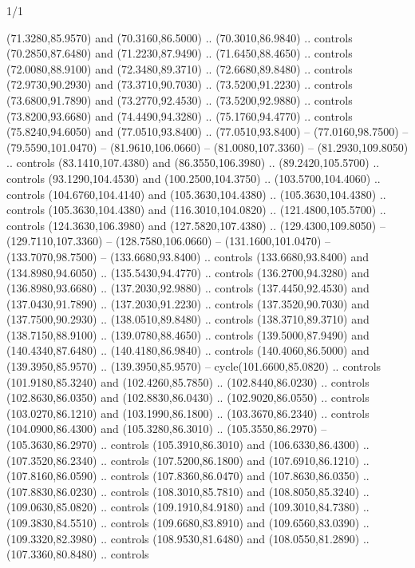 \begin{flagdescription}{1/1}
\begin{scope}[xshift=0.75\flaglength]
\begin{scope}[scale=0.00209\flagwidth,yshift=134.4mm,xshift=-29.7mm]
\begin{scope}[y=0.80pt, x=0.80pt, yscale=-1, xscale=1, inner sep=0pt, outer sep=0pt,line width=0.0015\flagwidth]
  (71.3280,85.9570) and (70.3160,86.5000) .. (70.3010,86.9840) .. controls
  (70.2850,87.6480) and (71.2230,87.9490) .. (71.6450,88.4650) .. controls
  (72.0080,88.9100) and (72.3480,89.3710) .. (72.6680,89.8480) .. controls
  (72.9730,90.2930) and (73.3710,90.7030) .. (73.5200,91.2230) .. controls
  (73.6800,91.7890) and (73.2770,92.4530) .. (73.5200,92.9880) .. controls
  (73.8200,93.6680) and (74.4490,94.3280) .. (75.1760,94.4770) .. controls
  (75.8240,94.6050) and (77.0510,93.8400) .. (77.0510,93.8400) --
  (77.0160,98.7500) -- (79.5590,101.0470) -- (81.9610,106.0660) --
  (81.0080,107.3360) -- (81.2930,109.8050) .. controls (83.1410,107.4380) and
  (86.3550,106.3980) .. (89.2420,105.5700) .. controls (93.1290,104.4530) and
  (100.2500,104.3750) .. (103.5700,104.4060) .. controls (104.6760,104.4140) and
  (105.3630,104.4380) .. (105.3630,104.4380) .. controls (105.3630,104.4380) and
  (116.3010,104.0820) .. (121.4800,105.5700) .. controls (124.3630,106.3980) and
  (127.5820,107.4380) .. (129.4300,109.8050) -- (129.7110,107.3360) --
  (128.7580,106.0660) -- (131.1600,101.0470) -- (133.7070,98.7500) --
  (133.6680,93.8400) .. controls (133.6680,93.8400) and (134.8980,94.6050) ..
  (135.5430,94.4770) .. controls (136.2700,94.3280) and (136.8980,93.6680) ..
  (137.2030,92.9880) .. controls (137.4450,92.4530) and (137.0430,91.7890) ..
  (137.2030,91.2230) .. controls (137.3520,90.7030) and (137.7500,90.2930) ..
  (138.0510,89.8480) .. controls (138.3710,89.3710) and (138.7150,88.9100) ..
  (139.0780,88.4650) .. controls (139.5000,87.9490) and (140.4340,87.6480) ..
  (140.4180,86.9840) .. controls (140.4060,86.5000) and (139.3950,85.9570) ..
  (139.3950,85.9570) -- cycle(101.6600,85.0820) .. controls (101.9180,85.3240)
  and (102.4260,85.7850) .. (102.8440,86.0230) .. controls (102.8630,86.0350)
  and (102.8830,86.0430) .. (102.9020,86.0550) .. controls (103.0270,86.1210)
  and (103.1990,86.1800) .. (103.3670,86.2340) .. controls (104.0900,86.4300)
  and (105.3280,86.3010) .. (105.3550,86.2970) -- (105.3630,86.2970) .. controls
  (105.3910,86.3010) and (106.6330,86.4300) .. (107.3520,86.2340) .. controls
  (107.5200,86.1800) and (107.6910,86.1210) .. (107.8160,86.0590) .. controls
  (107.8360,86.0470) and (107.8630,86.0350) .. (107.8830,86.0230) .. controls
  (108.3010,85.7810) and (108.8050,85.3240) .. (109.0630,85.0820) .. controls
  (109.1910,84.9180) and (109.3010,84.7380) .. (109.3830,84.5510) .. controls
  (109.6680,83.8910) and (109.6560,83.0390) .. (109.3320,82.3980) .. controls
  (108.9530,81.6480) and (108.0550,81.2890) .. (107.3360,80.8480) .. controls

\end{scope}
\end{scope}
\end{scope}
\end{flagdescription}
